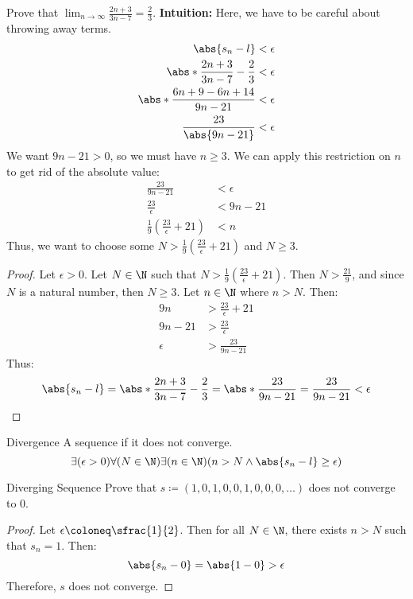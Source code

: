 \begin{exbox}{}{}
    Prove that $\lim_{n \to \infty} \frac{2n+3}{3n-7} = \frac{2}{3}$.
    \tcblower
    \textbf{Intuition:} Here, we have to be careful about throwing away terms.
    \begin{align*}
        \abs{s_n - l} &< \epsilon \\
        \abs*{\frac{2n+3}{3n-7} - \frac{2}{3}} &< \epsilon \\
        \abs*{\frac{6n+9-6n+14}{9n-21}} &< \epsilon \\
        \frac{23}{\abs{9n-21}} &< \epsilon
    \end{align*}
    We want $9n-21 > 0$, so we must have $n \geq 3$. We can apply this restriction on $n$ to get rid of the absolute value:
    \begin{align*}
        \frac{23}{9n-21} &< \epsilon \\
        \frac{23}{\epsilon} &< 9n - 21 \\
        \frac{1}{9} \left( \frac{23}{\epsilon} + 21 \right) &< n
    \end{align*}
    Thus, we want to choose some $N > \frac{1}{9} \left( \frac{23}{\epsilon} + 21 \right) $ and $N \geq 3$.
    \begin{proof}
        Let $\epsilon > 0$. Let $N \in \N$ such that $N > \frac{1}{9} \left( \frac{23}{\epsilon} + 21 \right)$. Then $N > \frac{21}{9}$, and since $N$ is a natural number, then $N \geq 3$. Let $n \in \N$ where $n > N$. Then:
        \begin{align*}
            9n &> \frac{23}{\epsilon} + 21 \\
            9n - 21 &> \frac{23}{\epsilon} \\
            \epsilon &> \frac{23}{9n - 21}
        \end{align*}
        Thus:
        \[ \abs{s_n - l} = \abs*{\frac{2n+3}{3n-7} - \frac{2}{3}} = \abs*{\frac{23}{9n-21}} = \frac{23}{9n-21} < \epsilon \]

    \end{proof}
\end{exbox}

\begin{dfnbox}{Divergence}{}
    A sequence  if it does not converge.
    \tcblower
    \[ \exists(\epsilon > 0) \forall(N \in \N) \exists(n \in \N) (n > N \land \abs{s_n -l} \geq \epsilon) \]
\end{dfnbox}

\begin{exbox}{Diverging Sequence}{}
    Prove that $s \coloneq (1,0,1,0,0,1,0,0,0,\ldots)$ does not converge to $0$.
    \tcblower
    \begin{proof}
        Let $\epsilon \coloneq \sfrac{1}{2}$. Then for all $N \in \N$, there exists $n > N$ such that $s_n = 1$. Then:
        \[ \abs{s_n - 0} = \abs{1-0} > \epsilon \]
        Therefore, $s$ does not converge.
    \end{proof}
\end{exbox}

